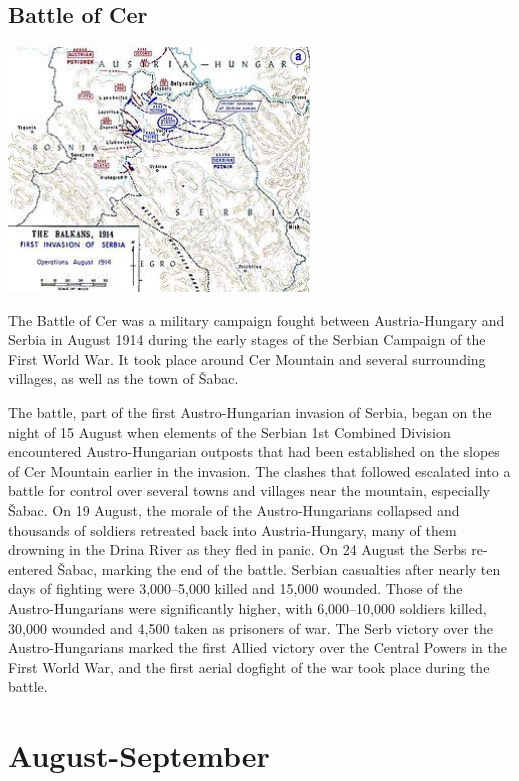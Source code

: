 \documentclass[11pt]{report}
\begin{document}
\subsection{Battle of Cer}
\vspace{2mm}\begin{center}\includegraphics[width=8cm]{./img/battleOfCer.jpg}\end{center}
The Battle of Cer was a military campaign fought between Austria-Hungary and Serbia in August 1914 during the early stages of the Serbian Campaign of the First World War. It took place around Cer Mountain and several surrounding villages, as well as the town of Šabac.

The battle, part of the first Austro-Hungarian invasion of Serbia, began on the night of 15 August when elements of the Serbian 1st Combined Division encountered Austro-Hungarian outposts that had been established on the slopes of Cer Mountain earlier in the invasion. The clashes that followed escalated into a battle for control over several towns and villages near the mountain, especially Šabac. On 19 August, the morale of the Austro-Hungarians collapsed and thousands of soldiers retreated back into Austria-Hungary, many of them drowning in the Drina River as they fled in panic. On 24 August the Serbs re-entered Šabac, marking the end of the battle. Serbian casualties after nearly ten days of fighting were 3,000–5,000 killed and 15,000 wounded. Those of the Austro-Hungarians were significantly higher, with 6,000–10,000 soldiers killed, 30,000 wounded and 4,500 taken as prisoners of war. The Serb victory over the Austro-Hungarians marked the first Allied victory over the Central Powers in the First World War, and the first aerial dogfight of the war took place during the battle.

\section{August-September}
\end{document}
